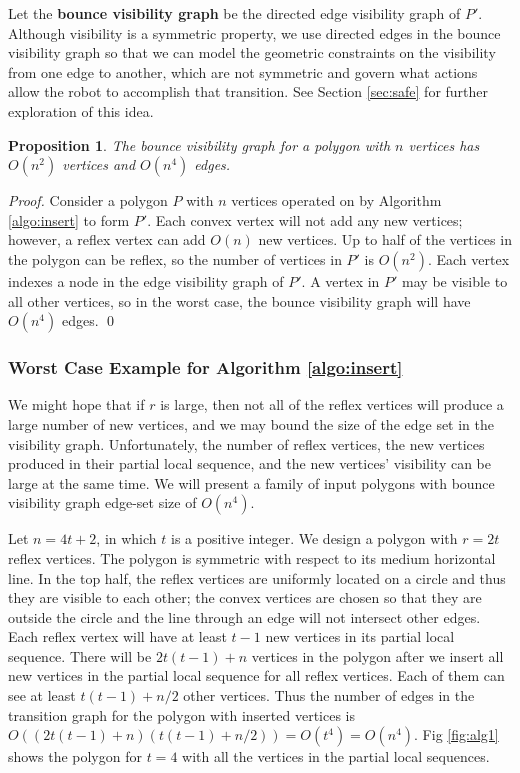 \documentclass[sageh,times,Review]{sagej}
\newtheorem{proposition}{Proposition}
\begin{document}
Let the \textbf{bounce visibility graph} be the directed edge visibility graph of
$P'$. Although visibility is a symmetric property, we use directed edges in the
bounce visibility graph so that 
we can model the 
geometric constraints on the visibility from one edge to another, which are
not symmetric and govern what actions allow the robot to accomplish that
transition. See Section \ref{sec:safe} for further exploration of this idea.



\begin{proposition} \label{prop:complexity}
The bounce visibility graph for a polygon with $n$ vertices has 
$O(n^2)$ vertices and $O(n^4)$ edges.
\end{proposition}

\begin{proof}

Consider a polygon $P$ with $n$ vertices operated on by Algorithm
\ref{algo:insert} to form $P'$. Each convex vertex will not add any new vertices; however, 
a reflex vertex can add $O(n)$ new vertices. Up to half of the vertices in the polygon 
can be reflex, so the number of vertices in $P'$ is $O(n^2)$. 
Each vertex indexes a node in the edge visibility graph of $P'$. A vertex 
in $P'$ may be visible to all other vertices, so in the worst
case, the bounce visibility graph will have $O(n^4)$ edges. \qed

\end{proof}

\subsubsection*{Worst Case Example for Algorithm \ref{algo:insert}}

We might hope that if $r$ is large, then not all of the reflex vertices will
produce a large number of new vertices, and we may bound the size of the edge
set in the visibility graph. Unfortunately, the number of reflex
vertices, the new vertices produced in their partial local sequence, and the new
vertices' visibility can be large at the same time. We will present a family of
input polygons with bounce visibility graph edge-set size of $O(n^4)$.

Let $n = 4t+2$, in which $t$ is a positive integer. We design a polygon with
$r = 2t$ reflex vertices. The polygon is symmetric with respect to its medium
horizontal line. In the top half, the reflex vertices are uniformly located on a
circle and thus they are visible to each other; the convex vertices are chosen
so that they are outside the circle and the line through an edge will not
intersect other edges. Each reflex vertex will have at least $t-1$ new
vertices in its partial local sequence. There will be $2t(t-1)+n$
vertices in the polygon after we insert all new vertices in the partial local
sequence for all reflex vertices. Each of them can see at least $t(t-1)+n/2$
other vertices. Thus the number of edges in the transition graph for the
polygon with inserted vertices is
$O ((2t(t-1)+n)(t(t-1)+n/2)) = O(t^4) = O(n^4)$.
Fig \ref{fig:alg1} shows the polygon for $t = 4$ with all the
vertices in the partial local sequences.
\end{document}
